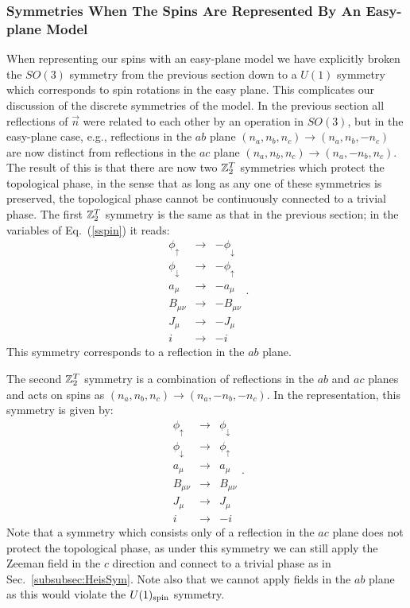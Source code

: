 \subsubsection{Symmetries When The Spins Are Represented By An Easy-plane \cp Model}
When representing our spins with an easy-plane \cp model we have explicitly broken the $SO(3)$ symmetry from the previous section down to a $U(1)$ symmetry which corresponds to spin rotations in the easy plane. 
This complicates our discussion of the discrete symmetries of the model. In the previous section all reflections of $\vec{n}$ were related to each other by an operation in $SO(3)$, but in the easy-plane case, e.g., reflections in the $ab$ plane $(n_a, n_b, n_c) \to (n_a, n_b, -n_c)$ are now distinct from reflections in the $ac$ plane $(n_a, n_b, n_c) \to (n_a, -n_b, n_c)$. The result of this is that there are now two $\mathbb{Z}_2^T$ symmetries which protect the topological phase, in the sense that as long as any one of these symmetries is preserved, the topological phase cannot be continuously connected to a trivial phase. 
The first $\mathbb{Z}_2^T$ symmetry is the same as that in the previous section; in the variables of Eq.~(\ref{sspin}) it reads:
\begin{equation}
\begin{array}{ccc}
 \phi_\uparrow&\rightarrow& -\phi_\downarrow \\
\phi_\downarrow&\rightarrow &-\phi_\uparrow \\
a_\mu&\rightarrow & -a_\mu \\
B_{\mu\nu}&\rightarrow & -B_{\mu\nu}\\
J_\mu &\rightarrow &-J_\mu \\
i & \rightarrow & -i
\end{array}.
\label{z2}
\end{equation}
This symmetry corresponds to a reflection in the $ab$ plane.

The second $\mathbb{Z}_2^T$ symmetry is a combination of reflections in the $ab$ and $ac$ planes and acts on spins as $(n_a, n_b, n_c) \to (n_a, -n_b, -n_c)$. In the \cp representation, this symmetry is given by:
\begin{equation}
\begin{array}{ccc}
 \phi_\uparrow&\rightarrow& \phi_\downarrow \\
\phi_\downarrow&\rightarrow &\phi_\uparrow \\
a_\mu&\rightarrow & a_\mu \\
B_{\mu\nu}&\rightarrow & B_{\mu\nu}\\
J_\mu &\rightarrow &J_\mu \\
i & \rightarrow & -i
\end{array}.
\label{z22}
\end{equation}
Note that a symmetry which consists only of a reflection in the $ac$ plane does not protect the topological phase, as under this symmetry we can still apply the Zeeman field in the $c$ direction and connect to a trivial phase as in Sec.~\ref{subsubsec:HeisSym}.  Note also that we cannot apply fields in the $ab$ plane as this would violate the $U(1)_{\rm spin}$ symmetry.

